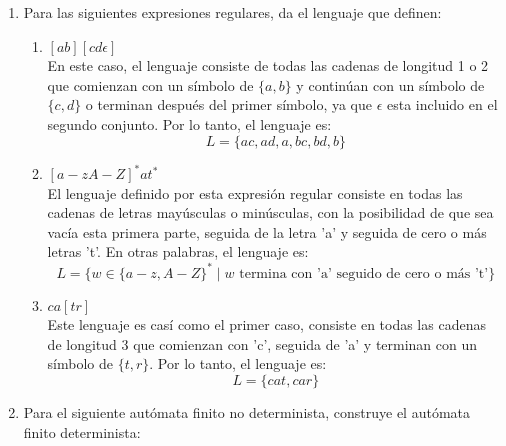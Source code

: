 \documentclass[12pt, letterpaper]{article}
\begin{document}
\begin{enumerate}
  \item Para las siguientes expresiones regulares, da el lenguaje que definen:
    \begin{enumerate}
    \item $[ab][cd\epsilon]$\\
      En este caso, el lenguaje consiste de todas las cadenas de longitud 1 o 2 que comienzan con un símbolo de $\{a,b\}$ y continúan con un símbolo de $\{c,d\}$ o terminan después del primer símbolo, ya que $\epsilon$ esta incluido en el segundo conjunto.
      Por lo tanto, el lenguaje es:
      \[ L = \{ac, ad, a, bc, bd, b\} \]
    \item $[a-zA-Z]^*at^*$\\
      El lenguaje definido por esta expresión regular consiste en todas las cadenas de letras mayúsculas o minúsculas, con la posibilidad de que sea vacía esta primera parte, seguida de la letra 'a' y seguida de cero o más letras 't'. En otras palabras, el lenguaje es:
      \[ L = \{ w \in \{a-z, A-Z\}^* \mid w \text{ termina con 'a' seguido de cero o más 't'} \} \]
    \item $ca[tr]$\\
      Este lenguaje es casí como el primer caso, consiste en todas las cadenas de longitud 3 que comienzan con 'c', seguida de 'a' y terminan con un símbolo de $\{t,r\}$. Por lo tanto, el lenguaje es:
      \[ L = \{cat, car\} \]
    \end{enumerate}
  \item Para el siguiente autómata finito no determinista, construye el autómata finito determinista:
    \begin{center}
\end{center}
\end{enumerate}
\end{document}
